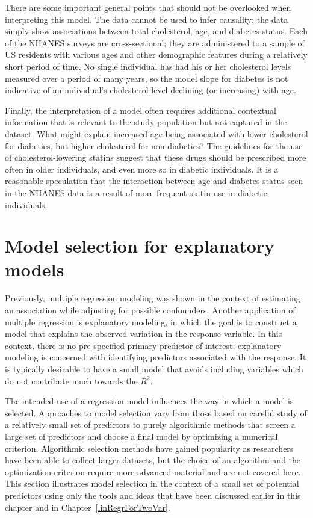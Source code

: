 There are some important general points that should not be overlooked when interpreting this model. The data cannot be used to infer causality; the data simply show associations between total cholesterol, age, and diabetes status. Each of the NHANES surveys are cross-sectional; they are administered to a sample of US residents with various ages and other demographic features during a relatively short period of time.  No single individual has had his or her cholesterol levels measured over a period of many years, so the model slope for diabetes is not indicative of an individual's cholesterol level declining (or increasing) with age.

Finally, the interpretation of a model often requires additional contextual information that is relevant to the study population but not captured in the dataset. What might explain increased age being associated with lower cholesterol for diabetics, but higher cholesterol for non-diabetics? The guidelines for the use of cholesterol-lowering statins suggest that these drugs should be prescribed more often in older individuals, and even more so in diabetic individuals. It is a reasonable speculation that the interaction between age and diabetes status seen in the NHANES data is a result of more frequent statin use in diabetic individuals.

\section{Model selection for explanatory models}
\label{modelSelection}



Previously, multiple regression modeling was shown in the context of estimating an association while adjusting for possible confounders. Another application of multiple regression is explanatory modeling, in which the goal is to construct a model that explains the observed variation in the response variable. In this context, there is no pre-specified primary predictor of interest; explanatory modeling is concerned with identifying predictors associated with the response. It is typically desirable to have a small model that avoids including variables which do not contribute much towards the $R^2$.

The intended use of a regression model influences the way in which a model is selected. Approaches to model selection vary from those based on careful study of a relatively small set of predictors to purely algorithmic methods that screen a large set of predictors and choose a final model by optimizing a numerical criterion. Algorithmic selection methods have gained popularity as researchers have been able to collect larger datasets, but the choice of an algorithm and the optimization criterion require more advanced material and are not covered here. This section illustrates model selection in the context of a small set of potential predictors using only the tools and ideas that have been discussed earlier in this chapter and in Chapter~\ref{linRegrForTwoVar}. 

